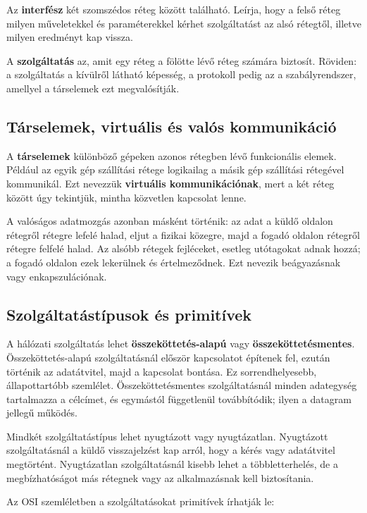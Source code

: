 Az \textbf{interfész} két szomszédos réteg között található. Leírja, hogy a felső réteg milyen műveletekkel és paraméterekkel kérhet szolgáltatást az alsó rétegtől, illetve milyen eredményt kap vissza.

A \textbf{szolgáltatás} az, amit egy réteg a fölötte lévő réteg számára biztosít. Röviden: a szolgáltatás a kívülről látható képesség, a protokoll pedig az a szabályrendszer, amellyel a társelemek ezt megvalósítják.

\subsection{Társelemek, virtuális és valós kommunikáció}

A \textbf{társelemek} különböző gépeken azonos rétegben lévő funkcionális elemek. Például az egyik gép szállítási rétege logikailag a másik gép szállítási rétegével kommunikál. Ezt nevezzük \textbf{virtuális kommunikációnak}, mert a két réteg között úgy tekintjük, mintha közvetlen kapcsolat lenne.

A valóságos adatmozgás azonban másként történik: az adat a küldő oldalon rétegről rétegre lefelé halad, eljut a fizikai közegre, majd a fogadó oldalon rétegről rétegre felfelé halad. Az alsóbb rétegek fejléceket, esetleg utótagokat adnak hozzá; a fogadó oldalon ezek lekerülnek és értelmeződnek. Ezt nevezik beágyazásnak vagy enkapszulációnak.

\subsection{Szolgáltatástípusok és primitívek}

A hálózati szolgáltatás lehet \textbf{összeköttetés-alapú} vagy \textbf{összeköttetésmentes}. Összeköttetés-alapú szolgáltatásnál először kapcsolatot építenek fel, ezután történik az adatátvitel, majd a kapcsolat bontása. Ez sorrendhelyesebb, állapottartóbb szemlélet. Összeköttetésmentes szolgáltatásnál minden adategység tartalmazza a célcímet, és egymástól függetlenül továbbítódik; ilyen a datagram jellegű működés.

Mindkét szolgáltatástípus lehet nyugtázott vagy nyugtázatlan. Nyugtázott szolgáltatásnál a küldő visszajelzést kap arról, hogy a kérés vagy adatátvitel megtörtént. Nyugtázatlan szolgáltatásnál kisebb lehet a többletterhelés, de a megbízhatóságot más rétegnek vagy az alkalmazásnak kell biztosítania.

Az OSI szemléletben a szolgáltatásokat primitívek írhatják le:

